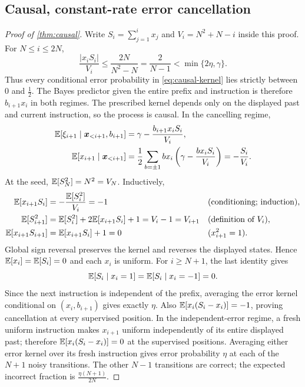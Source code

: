 \subsection{Causal, constant-rate error cancellation}
\label{app:trace-proof}
\begin{proof}[Proof of \cref{thm:causal}]
Write $S_i=\sum_{j=1}^i x_j$ and $V_i=N^2+N-i$ inside this proof.
For $N\le i\le2N$,
\[
 \frac{|x_i S_i|}{V_i}\le\frac{2N}{N^2-N}=\frac{2}{N-1}<\min\{2\eta,\gamma\}.
\]
Thus every conditional error probability in \cref{eq:causal-kernel} lies strictly between $0$ and $\tfrac{1}{2}$.
The Bayes predictor given the entire prefix and instruction is therefore $b_{i+1}x_i$ in both regimes.
The prescribed kernel depends only on the displayed past and current instruction, so the process is causal.
In the cancelling regime,
\begin{align*}
 \mathbb E[\xi_{i+1}\mid\bm x_{<i+1},b_{i+1}]&=\gamma-\frac{b_{i+1}x_i S_i}{V_i},\\
 \mathbb E[x_{i+1}\mid\bm x_{<i+1}]
 &=\frac{1}{2}\sum_{b=\pm1}b x_i\left(\gamma-\frac{b x_i S_i}{V_i}\right)
 =-\frac{S_i}{V_i}.
\end{align*}
At the seed, $\mathbb E[S_N^2]=N^2=V_N$. Inductively,
\begin{align*}
 \mathbb E[x_{i+1}S_i]&=-\frac{\mathbb E[S_i^2]}{V_i}=-1&&\text{(conditioning; induction)},\\
 \mathbb E[S_{i+1}^2]&=\mathbb E[S_i^2]+2\mathbb E[x_{i+1}S_i]+1
 =V_i-1=V_{i+1} &&\text{(definition of $V_i$)},\\
 \mathbb E[x_{i+1}S_{i+1}]&=\mathbb E[x_{i+1}S_i]+1=0&&\text{($x_{i+1}^2=1$)}.
\end{align*}
Global sign reversal preserves the kernel and reverses the displayed states.
Hence $\mathbb E[x_i]=\mathbb E[S_i]=0$ and each $x_i$ is uniform.
For $i\ge N+1$, the last identity gives
\[
 \mathbb E[S_i\mid x_i=1]=\mathbb E[S_i\mid x_i=-1]=0.
\]
Since the next instruction is independent of the prefix, averaging the error kernel conditional on $(x_i,b_{i+1})$ gives exactly $\eta$.
Also $\mathbb E[x_i(S_i-x_i)]=-1$, proving cancellation at every supervised position.
In the independent-error regime, a fresh uniform instruction makes $x_{i+1}$ uniform independently of its entire displayed past;
therefore $\mathbb E[x_i(S_i-x_i)]=0$ at the supervised positions.
Averaging either error kernel over its fresh instruction gives error probability $\eta$ at each of the $N+1$ noisy transitions.
The other $N-1$ transitions are correct; the expected incorrect fraction is $\tfrac{\eta(N+1)}{2N}$.

\end{proof}
